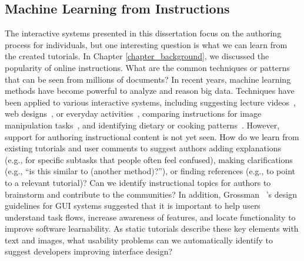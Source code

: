 \subsection{Machine Learning from Instructions}
The interactive systems presented in this dissertation focus on the authoring process for individuals, but one interesting question is what we can learn from the created tutorials. In Chapter \ref{chapter_background}, we discussed the popularity of online instructions. What are the common techniques or patterns that can be seen from millions of documents?
%
In recent years, machine learning methods have become powerful to analyze and reason big data. Techniques have been applied to various interactive systems, including suggesting lecture videos~\cite{Kim:2014:DIT:2642918.2647389}, web designs~\cite{Kumar:2013:WDM:2470654.2466420}, or everyday activities~\cite{Fast:2016:AMH:2858036.2858528}, comparing instructions for image manipulation tasks~\cite{Pavel:EECS-2013-167}, and identifying dietary or cooking patterns~\cite{IBMChefWatson,West:2013:CCI:2488388.2488510}.
%
However, support for authoring instructional content is not yet seen. How do we learn from existing tutorials and user comments to suggest authors adding explanations (e.g., for specific subtasks that people often feel confused), making clarifications (e.g., ``is this similar to (another method)?''), or finding references (e.g., to point to a relevant tutorial)? Can we identify instructional topics for authors to brainstorm and contribute to the communities?
%
In addition, Grossman \ea{}~\cite{Grossman:2009:SSL:1518701.1518803}'s design guidelines for GUI systems suggested that it is important to help users understand task flows, increase awareness of features, and locate functionality to improve software learnability. As static tutorials describe these key elements with text and images, what usability problems can we automatically identify to suggest developers improving interface design?

